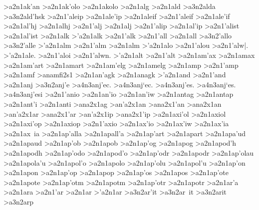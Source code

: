 {>a2n1ak'an
>a2n1ak'olo 		%
>a2n1akolo
>a2n1alg  		%
>a2n1ald  		%
	>a3n2alda 		%
	>a3n2ald'hsk 		%
>a2n1'aleip		%
>a2n1ale'ip
>a2n1aleif 		%
>a2n1'aleif 		%
>a2n1ale'if
>a2n1al'hj 		%
>a2n1alhj
>a2n1'alj 		%
>a2n1alj
>a2n1'alip 		%
>a2n1al'ip
>a2n1'alist 		%
>a2n1al'ist
>a2n1alk  		%
>'a2n1alk 		%
>a2n1'alk
>a2n1'all     		%
>a2n1all
	>a3n2'allo 		%
	>a3n2'alle
>'a2n1alm 		%
>a2n1'alm 		%
>a2n1alm
>'a2n1alo 		%
>a2n1'alou
>a2n1'alw|.
>'a2n1ale.
>a2n1'aloi
>a2n1'alwn.
>'a2n1alt 		%
>a2n1'alt
>a2n1am'ax 		%
>a2n1amax
>a2n1am'art 		%
>a2n1amart
>a2n1am'elg 		%
>a2n1amelg
>a2n1amp 		%
>a2n1'amp 		%
>a2n1amf 		%
>anamfi2s1 		%
>a2n1an'agk 		%
>a2n1anagk
>'a2n1and 		%
>a2n1'and
>a2n1anj 		%
	>a3n2anj'e 		%
		>a4n3anj'ec. 		%
		>a4n3anj`ec.
		>a4n3anj'es.
		>a4n3anj`es.
		>a4n3anj'esi
>a2n1'anio 		%
>a2n1an'io
>a2n1an'iw
>a2n1antag 		%
>a2n1antap 		%
>a2n1ant'i 		%
>a2n1anti
>ana2x1ag  		%
>an'a2x1an 		%
>ana2x1'an
>ana2x1an 		%
>an'a2x1ar	 	%
>ana2x1'ar
>an'a2x1ip  		%
>ana2x1'ip
>a2n1axi'ol   		%
>a2n1axiol
>a2n1axi'op  		%
>a2n1axiop
>a2n1'axio 		%
>a2n1ax'io
>a2n1ax'iw
>a2n1ax'ia
>a2n1ax~ia
>a2n1ap'alla 		%
>a2n1apall'a
>a2n1ap'art 		%
>a2n1apart
>a2n1apa'ud 		%
>a2n1apaud
>a2n1ap'ob 		%
>a2n1apob
>a2n1ap'og 		%
>a2n1apog
>a2n1apod'h 		%
>a2n1apodh
>a2n1ap'odo 		%
>a2n1apod'o
>a2n1ap'odr 		%
>a2n1apodr
>a2n1ap'olau 		%
>a2n1apola'u
>a2n1apol'o 		%
>a2n1apolo
>a2n1ap'olu 		%
>a2n1apol'u
>a2n1ap'on		%
>a2n1apon
>a2n1ap'op 		%
>a2n1apop 
>a2n1ap'os 		%
>a2n1apos
>a2n1ap'ote 		%
>a2n1apote
>a2n1ap'otm 		%
>a2n1apotm
>a2n1ap'otr 		%
>a2n1apotr
>a2n1ar'a 		%
>a2n1ara
>a2n1'ar    		%
>a2n1ar
>'a2n1ar     		%
	>a3n2ar'it		%
	>a3n2ar~it		%
	>a3n2arit		%
	>a3n2arp		%
}
